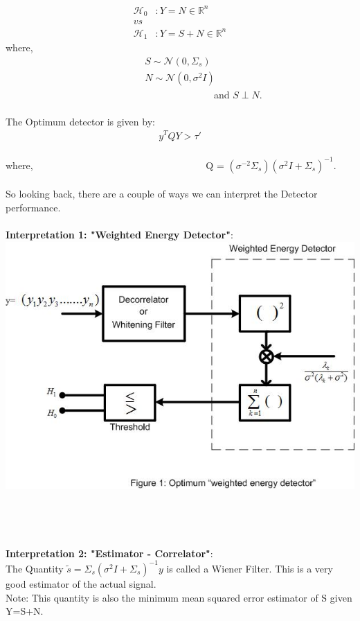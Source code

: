 \documentclass[a4paper,english,12pt]{article}
\begin{document}
 \begin{align*}
 \mathcal{H}_0 &: Y = N \in \mathbb{R}^n\\
 vs\\
 \mathcal{H}_1 &: Y = S+N \in \mathbb{R}^n 
 \end{align*}
 where,  
 \begin{align*}  
 S\sim \mathcal{N}(0,\Sigma_s)\\
 N\sim \mathcal{N}(0,\sigma^2I)
 \end{align*} \ \ \ \ \ \ \ \ \ \ \ \ \ \ \ \ \ \ \ \ \ \ \ \ \ \ \ \ \ \ \ \ \ \ \ \ \ \ \ \ \ \ \ and $S\perp N$.\\
\\ The Optimum detector is given by:\\
     \begin{align*}
       y^TQY>\tau'
       \end{align*}\\
   where,
 \ \ \ \ \ \ \ \ \ \ \ \ \ \ \ \ \ \ \ \ \ \ \ \ \ \ \ \ \ \ \ \ \ \ \ Q = $(\sigma^{-2}\Sigma_s)(\sigma^{2}I+\Sigma_s)^{-1}$.\\
 \\So looking back, there are a couple of ways we can interpret the Detector performance.\\
 \\\textbf{Interpretation 1: "Weighted Energy Detector"}:\\
 \includegraphics{Figures/figure1}\\
 \\
 \\
 \\
 \\\textbf{Interpretation 2: "Estimator - Correlator"}:\\
 The Quantity $\tilde{s}=\Sigma_s(\sigma^2I + \Sigma_s)^{-1}y$ is called a Wiener Filter. This is a very good estimator of the actual signal.\\
 Note: This quantity is also the minimum mean squared error estimator of S given Y=S+N.\\
 
\end{document}
